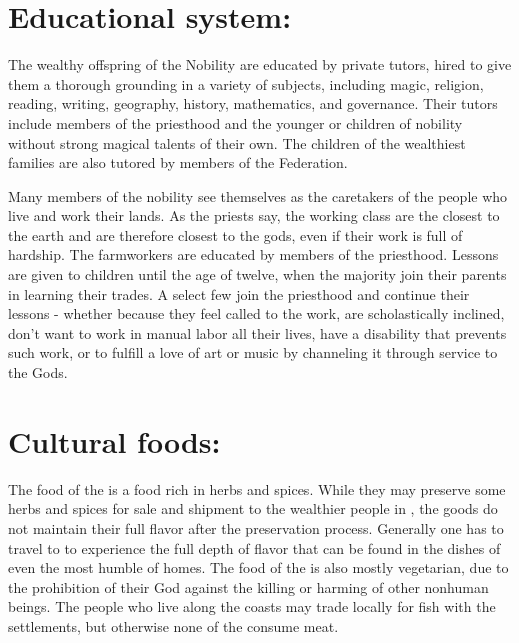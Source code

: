 \documentclass[blue]{GL2020}
\begin{document}
\section*{Educational system:}

The wealthy offspring of the Nobility are educated by private tutors, hired to give them a thorough grounding in a variety of subjects, including magic, religion, reading, writing, geography, history, mathematics, and governance.  Their tutors include members of the priesthood and the younger or children of nobility without strong magical talents of their own.  The children of the wealthiest families are also tutored by members of the Federation.

Many members of the nobility see themselves as the caretakers of the people who live and work their lands.  As the priests say, the working class are the closest to the earth and are therefore closest to the gods, even if their work is full of hardship.  The farmworkers are educated by members of the priesthood.  Lessons are given to children until the age of twelve, when the majority join their parents in learning their trades.  A select few join the priesthood and continue their lessons - whether because they feel called to the work, are scholastically inclined, don't want to work in manual labor all their lives, have a disability that prevents such work, or to fulfill a love of art or music by channeling it through service to the Gods.

\section*{Cultural foods:}

The food of the \pFarm{} is a food rich in herbs and spices.  While they may preserve some herbs and spices for sale and shipment to the wealthier people in \pTech{}, the goods do not maintain their full flavor after the preservation process.  Generally one has to travel to \pFarm{} to experience the full depth of flavor that can be found in the dishes of even the most humble of homes.  The food of the \pFarmers{} is also mostly vegetarian, due to the prohibition of their God against the killing or harming of other nonhuman beings.  The people who live along the coasts may trade locally for fish with the \pShip{} settlements, but otherwise none of the \pFarm{} consume meat.

\end{document}
